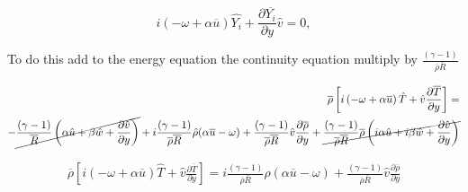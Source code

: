 \begin{equation} 
i
\left(
-
\omega 
+
\alpha 
\overline{u}
\right)
\hat{Y_i}
+
\frac{\partial \overline{Y_i}}{\partial y}
\hat{v}
=
0
,
\end{equation} 























To do this add  to the 
energy equation the continuity equation multiply by 
$\frac{(\gamma-1)}{\overline{\rho}\overline{R}}$ 

\begin{equation*} 
\begin{split} 
\overline{\rho}
\left[
    i
    \left(
    -
    \omega 
    +
    \alpha 
    \overline{u}
    \right)
    \hat{T}
    +
    \hat{v}
    \frac{\partial \overline{T} }{\partial y}
\right]
=
\\
-
\cancel{
\frac{(\gamma-1)}{\overline{R}}
\left(
\alpha
\hat{u}
+
\beta
\hat{w}
+
\frac{\partial \hat{v}}{\partial y}
\right)
}
+
i
\frac{(\gamma-1)}{\overline{\rho}\overline{R}}
\hat{\rho}
(\alpha\overline{u}- \omega) 
+
\frac{(\gamma-1)}{\overline{\rho}\overline{R}}
\hat{v}
\frac{\partial \overline{\rho}}{\partial y} 
+
\cancel{
\frac{(\gamma-1)}{\overline{\rho}\overline{R}}
\overline{\rho}
\left(
i
\alpha
\hat{u}
+
i
\beta
\hat{w}
+
\frac{\partial \hat{v}}{\partial y}
\right)
}
\end{split} 
\end{equation*} 

\begin{equation*} 
\begin{split} 
\overline{\rho}
\left[
    i
    \left(
    -
    \omega 
    +
    \alpha 
    \overline{u}
    \right)
    \hat{T}
    +
    \hat{v}
    \frac{\partial \overline{T} }{\partial y}
\right]
=
i
\frac{(\gamma-1)}{\overline{\rho}\overline{R}}
\hat{\rho}
(\alpha\overline{u}- \omega) 
+
\frac{(\gamma-1)}{\overline{\rho}\overline{R}}
\hat{v}
\frac{\partial \overline{\rho}}{\partial y} 
\end{split} 
\end{equation*} 
